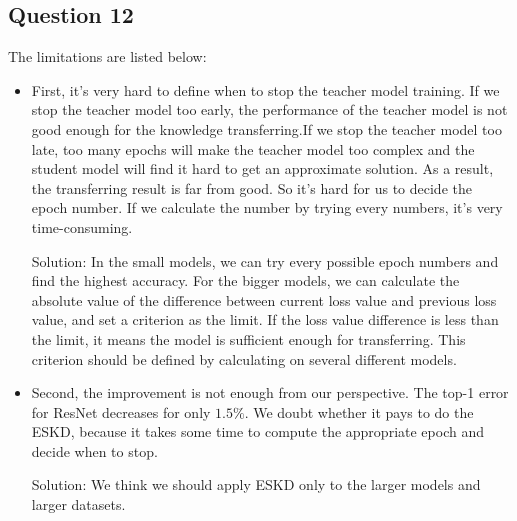 \documentclass[conference]{IEEEtran}
\begin{document}
  \subsection{Question 12}
  The limitations are listed below:
  \begin{itemize}
      \item First, it's very hard to define when to stop the teacher model training. 
      If we stop the teacher model too early, the performance of the teacher model is not good enough for the knowledge transferring.If we stop the teacher model too late, too many epochs will make the teacher model too complex and the student model will find it hard to get an approximate solution. As a result, the transferring result is far from good. So it's hard for us to decide the epoch number. If we calculate the number by trying every numbers, it's very time-consuming. \par
      Solution: In the small models, we can try every possible epoch numbers and find the highest accuracy.
      For the bigger models, we can calculate the absolute value of the difference between current loss value and previous loss value, and set a criterion as the limit. If the loss value difference is less than the limit, it means the model is sufficient enough for transferring. This criterion should be defined by calculating on several different models.
      \item Second, the improvement is not enough from our perspective. The top-1 error for ResNet decreases for only $1.5\%$. We doubt whether it pays to do the ESKD, because it takes some time to compute the appropriate epoch and decide when to stop.\par
      Solution: We think we should apply ESKD only to the larger models and larger datasets.
  \end{itemize}
\end{document}
